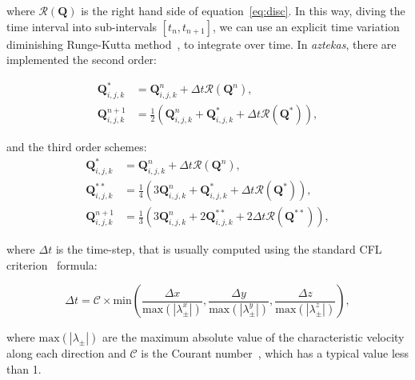 \noindent where $\mathcal{R}(\mathbf{Q})$ is the right hand side of equation~\eqref{eq:disc}. In this way, diving the time interval into sub-intervals $[t_n,t_{n+1}]$, we can use an explicit time variation diminishing Runge-Kutta method~\citep{shu1988}, to integrate over time. In \textit{aztekas}, there are implemented the second order:

\begin{equation}
\begin{split}
    \mathbf{Q}_{i,j,k}^* &= \mathbf{Q}_{i,j,k}^n + \Delta t \mathcal{R}(\mathbf{Q}^n), \\
    \mathbf{Q}_{i,j,k}^{n+1} &= \frac{1}{2} \left( \mathbf{Q}_{i,j,k}^n + \mathbf{Q}_{i,j,k}^* + \Delta t \mathcal{R}(\mathbf{Q}^*) \right),
\end{split}
\label{eq:rk2}
\end{equation}

\noindent and the third order schemes:
\begin{equation}
\begin{split}
    \mathbf{Q}_{i,j,k}^* &= \mathbf{Q}_{i,j,k}^n + \Delta t \mathcal{R}(\mathbf{Q}^n), \\
    \mathbf{Q}_{i,j,k}^{**} &= \frac{1}{4} \left( 3\mathbf{Q}_{i,j,k}^n + \mathbf{Q}_{i,j,k}^* + \Delta t \mathcal{R}(\mathbf{Q}^*) \right), \\
    \mathbf{Q}_{i,j,k}^{n+1} &= \frac{1}{3} \left( 3\mathbf{Q}_{i,j,k}^n + 2\mathbf{Q}_{i,j,k}^{**} + 2\Delta t \mathcal{R}(\mathbf{Q}^{**}) \right),
\end{split}
\label{eq:rk3}
\end{equation}

\noindent where $\Delta t$ is the time-step, that is usually computed using the standard CFL criterion~\citep{cfl1928} formula:

\begin{equation}
    \Delta t = \mathcal{C} \times \mathrm{min} \left( \frac{\Delta x}{\mathrm{max}(|\lambda^x_\pm|)},\frac{\Delta y}{\mathrm{max}(|\lambda^y_\pm|)},\frac{\Delta z}{\mathrm{max}(|\lambda^z_\pm|)} \right),
    \label{eq:cfl}
\end{equation}

\noindent where $\mathrm{max}(|\lambda_\pm|)$ are the maximum absolute value of the characteristic velocity along each direction and $\mathcal{C}$ is the Courant number~\citep[see][]{cfl1928}, which has a typical value less than 1.


